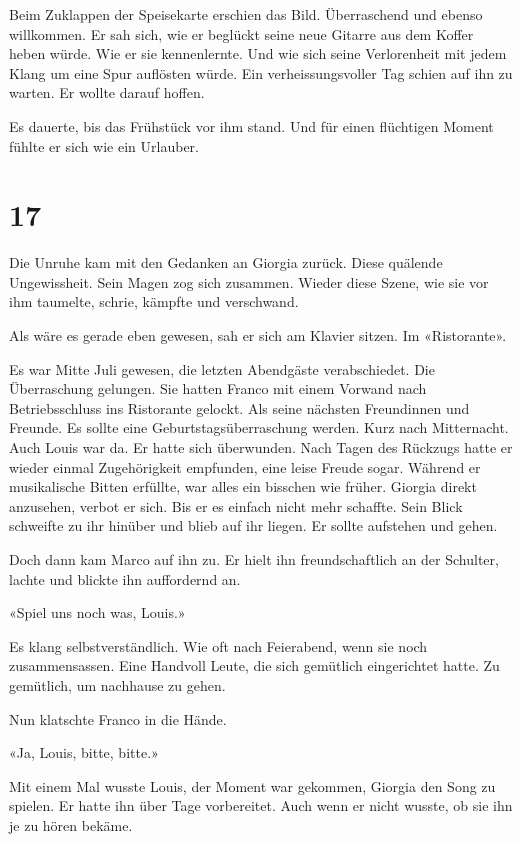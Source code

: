 Beim Zuklappen der Speisekarte erschien das Bild. Überraschend und
ebenso willkommen. Er sah sich, wie er beglückt seine neue Gitarre aus
dem Koffer heben würde. Wie er sie kennenlernte. Und wie sich seine
Verlorenheit mit jedem Klang um eine Spur auflösten würde. Ein
verheissungsvoller Tag schien auf ihn zu warten. Er wollte darauf
hoffen.

Es dauerte, bis das Frühstück vor ihm stand. Und für einen flüchtigen
Moment fühlte er sich wie ein Urlauber.

\chapter{17}\label{section-16}

Die Unruhe kam mit den Gedanken an Giorgia zurück. Diese quälende
Ungewissheit. Sein Magen zog sich zusammen. Wieder diese Szene, wie sie
vor ihm taumelte, schrie, kämpfte und verschwand.

Als wäre es gerade eben gewesen, sah er sich am Klavier sitzen. Im
«Ristorante».

Es war Mitte Juli gewesen, die letzten Abendgäste verabschiedet. Die
Überraschung gelungen. Sie hatten Franco mit einem Vorwand nach
Betriebsschluss ins Ristorante gelockt. Als seine nächsten Freundinnen
und Freunde. Es sollte eine Geburtstagsüberraschung werden. Kurz nach
Mitternacht. Auch Louis war da. Er hatte sich überwunden. Nach Tagen des
Rückzugs hatte er wieder einmal Zugehörigkeit empfunden, eine leise
Freude sogar. Während er musikalische Bitten erfüllte, war alles ein
bisschen wie früher. Giorgia direkt anzusehen, verbot er sich. Bis er es
einfach nicht mehr schaffte. Sein Blick schweifte zu ihr hinüber und
blieb auf ihr liegen. Er sollte aufstehen und gehen.

Doch dann kam Marco auf ihn zu. Er hielt ihn freundschaftlich an der
Schulter, lachte und blickte ihn auffordernd an.

«Spiel uns noch was, Louis.»

Es klang selbstverständlich. Wie oft nach Feierabend, wenn sie noch
zusammensassen. Eine Handvoll Leute, die sich gemütlich eingerichtet
hatte. Zu gemütlich, um nachhause zu gehen.

Nun klatschte Franco in die Hände.

«Ja, Louis, bitte, bitte.»

Mit einem Mal wusste Louis, der Moment war gekommen, Giorgia den Song zu
spielen. Er hatte ihn über Tage vorbereitet. Auch wenn er nicht wusste,
ob sie ihn je zu hören bekäme.


